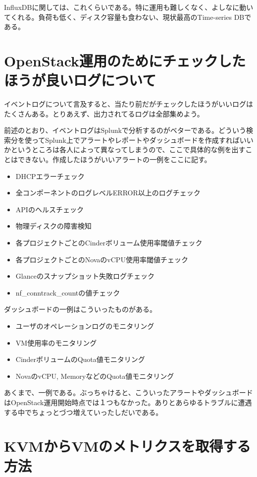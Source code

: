 InfluxDBに関しては、これくらいである。特に運用も難しくなく、よしなに動いてくれる。負荷も低く、ディスク容量も食わない、現状最高のTime-series DBである。

\section{OpenStack運用のためにチェックしたほうが良いログについて}
イベントログについて言及すると、当たり前だがチェックしたほうがいいログはたくさんある。とりあえず、出力されてるログは全部集めよう。

前述のとおり、イベントログはSplunkで分析するのがベターである。どういう検索分を使ってSplunk上でアラートやレポートやダッシュボードを作成すればいいかというところは各人によって異なってしまうので、ここで具体的な例を出すことはできない。作成したほうがいいアラートの一例をここに記す。

\begin{itemize}
	\item DHCPエラーチェック
	\item 全コンポーネントのログレベルERROR以上のログチェック
	\item APIのヘルスチェック
	\item 物理ディスクの障害検知
	\item 各プロジェクトごとのCinderボリューム使用率閾値チェック
	\item 各プロジェクトごとのNovaのvCPU使用率閾値チェック
	\item Glanceのスナップショット失敗ログチェック
	\item nf_conntrack_countの値チェック
\end{itemize}

ダッシュボードの一例はこういったものがある。

\begin{itemize}
	\item ユーザのオペレーションログのモニタリング
	\item VM使用率のモニタリング
	\item CinderボリュームのQuota値モニタリング
	\item NovaのvCPU, MemoryなどのQuota値モニタリング
\end{itemize}

あくまで、一例である。ぶっちゃけると、こういったアラートやダッシュボードはOpenStack運用開始時点では１つもなかった。ありとあらゆるトラブルに遭遇する中でちょっとづつ増えていったしだいである。

\section{KVMからVMのメトリクスを取得する方法}
